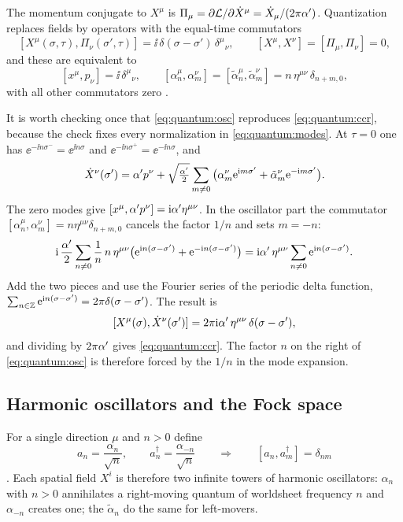 The momentum conjugate to $X^\mu$ is $\Pi_\mu=\partial\mathcal L/\partial\dot X^\mu
=\dot X_\mu/(2\pi\alpha')$. Quantization replaces fields by operators with the equal-time
commutators
\begin{equation}\label{eq:quantum:ccr}
 [X^\mu(\sigma,\tau),\Pi_\nu(\sigma',\tau)]=\ii\,\delta(\sigma-\sigma')\,\delta^\mu{}_\nu,
 \qquad [X^\mu,X^\nu]=[\Pi_\mu,\Pi_\nu]=0 ,
\end{equation}
and these are equivalent to
\begin{equation}\label{eq:quantum:osc}
 [x^\mu,p_\nu]=\ii\,\delta^\mu{}_\nu,\qquad
 [\alpha^\mu_n,\alpha^\nu_m]=[\tilde\alpha^\mu_n,\tilde\alpha^\nu_m]
   =n\,\eta^{\mu\nu}\,\delta_{n+m,0},
\end{equation}
with all other commutators zero .

It is worth checking once that \cref{eq:quantum:osc} reproduces \cref{eq:quantum:ccr},
because the check fixes every normalization in \cref{eq:quantum:modes}. At $\tau=0$ one has
$\ee^{-\ii n\sigma^-}=\ee^{\ii n\sigma}$ and $\ee^{-\ii n\sigma^+}=\ee^{-\ii n\sigma}$, and
\[
 \dot X^\nu(\sigma')=\alpha' p^\nu+\sqrt{\tfrac{\alpha'}{2}}\sum_{m\ne0}
   \big(\alpha^\nu_m\mathrm{e}^{\mathrm{i} m\sigma'}+\tilde\alpha^\nu_m\mathrm{e}^{-\mathrm{i} m\sigma'}\big).
\]
The zero modes give $[x^\mu,\alpha' p^\nu]=\mathrm{i}\alpha'\eta^{\mu\nu}$. In the oscillator part the
commutator $[\alpha^\mu_n,\alpha^\nu_m]=n\eta^{\mu\nu}\delta_{n+m,0}$ cancels the factor $1/n$
and sets $m=-n$:
\[
 \mathrm{i}\,\frac{\alpha'}{2}\sum_{n\ne0}\frac1n\,n\,\eta^{\mu\nu}
   \big(\mathrm{e}^{\mathrm{i} n(\sigma-\sigma')}+\mathrm{e}^{-\mathrm{i} n(\sigma-\sigma')}\big)
 =\mathrm{i}\alpha'\,\eta^{\mu\nu}\sum_{n\neq0}\mathrm{e}^{\mathrm{i} n(\sigma-\sigma')} .
\]
Add the two pieces and use the Fourier series of the periodic delta function,
$\sum_{n\in\mathbb{Z}}\mathrm{e}^{\mathrm{i} n(\sigma-\sigma')}=2\pi\delta(\sigma-\sigma')$. The result is
\[
 [X^\mu(\sigma),\dot X^\nu(\sigma')]=2\pi\mathrm{i}\alpha'\,\eta^{\mu\nu}\,\delta(\sigma-\sigma') ,
\]
and dividing by $2\pi\alpha'$ gives \cref{eq:quantum:ccr}. The factor $n$ on the right of
\cref{eq:quantum:osc} is therefore forced by the $1/n$ in the mode expansion.

\subsection{Harmonic oscillators and the Fock space}

For a single direction $\mu$ and $n>0$ define
\begin{equation}\label{eq:quantum:ladder}
  a_n=\frac{\alpha_n}{\sqrt n},\qquad a_n^\dagger=\frac{\alpha_{-n}}{\sqrt n}
  \qquad\Longrightarrow\qquad [a_n,a_m^\dagger]=\delta_{nm}
\end{equation}
. Each spatial field $X^i$ is therefore two infinite
towers of harmonic oscillators: $\alpha_n$ with $n>0$ annihilates a right-moving quantum of
worldsheet frequency $n$ and $\alpha_{-n}$ creates one; the $\tilde\alpha_n$ do the same for
left-movers.

